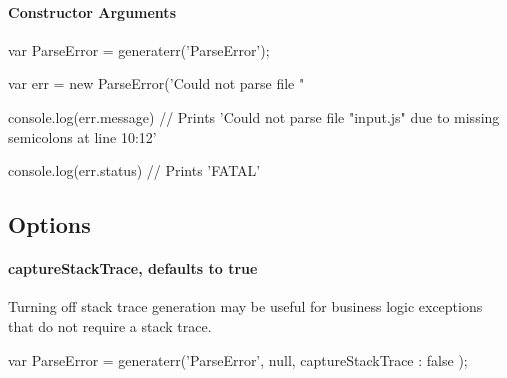 \paragraph*{Constructor Arguments}

\begin{DoxyVerb}var ParseError = generaterr('ParseError');

var err = new ParseError('Could not parse file "%

console.log(err.message)
// Prints 'Could not parse file "input.js" due to missing semicolons at line 10:12'

console.log(err.status)
// Prints 'FATAL'
\end{DoxyVerb}


\subsection*{Options}

\paragraph*{capture\+Stack\+Trace, defaults to \textquotesingle{}true\textquotesingle{}}

Turning off stack trace generation may be useful for business logic exceptions that do not require a stack trace. \begin{DoxyVerb}var ParseError = generaterr('ParseError', null, { captureStackTrace : false });\end{DoxyVerb}
 